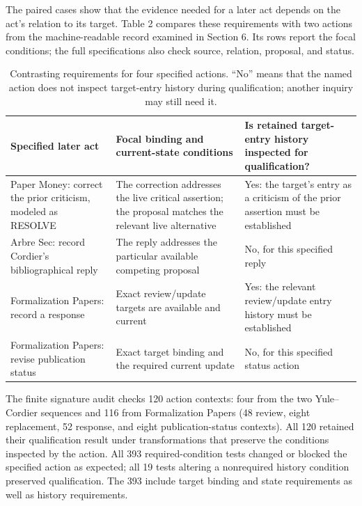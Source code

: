 \documentclass[11pt,a4paper]{article}
\begin{document}
The paired cases show that the evidence needed for a later act depends on the act's relation to its target. Table 2 compares these requirements with two actions from the machine-readable record examined in Section 6. Its rows report the focal conditions; the full specifications also check source, relation, proposal, and status.


\begin{table}[H]
\centering
\footnotesize
\renewcommand{\arraystretch}{1.18}
\setlength{\tabcolsep}{3pt}
\begin{tabular}{>{\raggedright\arraybackslash}p{.23\linewidth}>{\raggedright\arraybackslash}p{.25\linewidth}>{\raggedright\arraybackslash}p{.43\linewidth}}
\toprule
Specified later act & Focal binding and current-state conditions & Is retained target-entry history inspected for qualification? \\
\midrule
Paper Money: correct the prior criticism, modeled as RESOLVE & The correction addresses the live critical assertion; the proposal matches the relevant live alternative & Yes: the target's entry as a criticism of the prior assertion must be established \\
Arbre Sec: record Cordier's bibliographical reply & The reply addresses the particular available competing proposal & No, for this specified reply \\
Formalization Papers: record a response & Exact review/update targets are available and current & Yes: the relevant review/update entry history must be established \\
Formalization Papers: revise publication status & Exact target binding and the required current update & No, for this specified status action \\
\bottomrule
\end{tabular}
\caption{Contrasting requirements for four specified actions. “No” means that the named action does not inspect target-entry history during qualification; another inquiry may still need it.}
\label{tab:2}
\end{table}

The finite signature audit checks 120 action contexts: four from the two Yule–Cordier sequences and 116 from Formalization Papers (48 review, eight replacement, 52 response, and eight publication-status contexts). All 120 retained their qualification result under transformations that preserve the conditions inspected by the action. All 393 required-condition tests changed or blocked the specified action as expected; all 19 tests altering a nonrequired history condition preserved qualification. The 393 include target binding and state requirements as well as history requirements.
\end{document}
